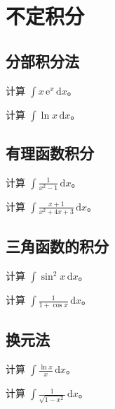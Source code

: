 \documentclass{kazetex}
\begin{document}
\section{不定积分}

\subsection{分部积分法}

\begin{problem}
  计算 $\displaystyle\int x\,\mathrm{e}^{x}\,\mathrm{d}x$。
\end{problem}

\begin{problem}
  计算 $\displaystyle\int \ln x\,\mathrm{d}x$。
\end{problem}

\subsection{有理函数积分}

\begin{problem}
  计算 $\displaystyle\int \frac{1}{x^2-1}\,\mathrm{d}x$。
\end{problem}

\begin{problem}
  计算 $\displaystyle\int \frac{x+1}{x^2+4x+3}\,\mathrm{d}x$。
\end{problem}

\subsection{三角函数的积分}

\begin{problem}
  计算 $\displaystyle\int \sin^2 x\,\mathrm{d}x$。
\end{problem}

\begin{problem}
  计算 $\displaystyle\int \frac{1}{1+\cos x}\,\mathrm{d}x$。
\end{problem}

\subsection{换元法}

\begin{problem}
  计算 $\displaystyle\int \frac{\ln x}{x}\,\mathrm{d}x$。
\end{problem}

\begin{problem}
  计算 $\displaystyle\int \frac{1}{\sqrt{1-x^2}}\,\mathrm{d}x$。
\end{problem}
\end{document}
